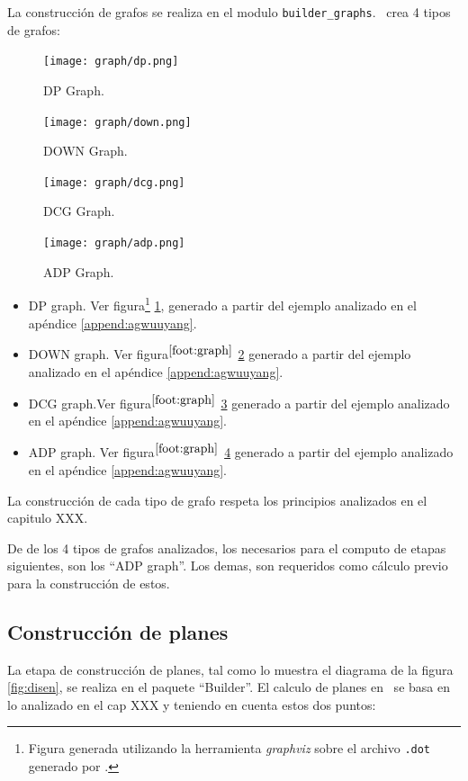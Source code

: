La construcción de grafos se realiza en el modulo \texttt{builder\_graphs}. \maggen\ crea 4 tipos de grafos:
\begin{figure}\centering
 \texttt{[image: graph/dp.png]}
\caption{\label{dpgraph} DP Graph.}
\end{figure}

\begin{figure}\centering
 \texttt{[image: graph/down.png]}
\caption{\label{downgraph} DOWN Graph.}
\end{figure}

\begin{figure}\centering
 \texttt{[image: graph/dcg.png]}
\caption{\label{dcggraph} DCG Graph.}
\end{figure}

\begin{figure}\centering
 \texttt{[image: graph/adp.png]}
\caption{\label{adpgraph} ADP Graph.}
\end{figure}


\begin{itemize}
\item DP graph. Ver figura\footnote {\label{foot:graph} Figura generada utilizando la herramienta \textit{graphviz} sobre el archivo \texttt{.dot} generado por \maggen.} \ref{dpgraph}, generado a partir del ejemplo analizado en el apéndice \ref{append:agwuuyang}.
\item DOWN graph. Ver figura$^{\ref{foot:graph}}$ \ref{downgraph} generado a partir del ejemplo analizado en el apéndice \ref{append:agwuuyang}.
\item DCG graph.Ver figura$^{\ref{foot:graph}}$ \ref{dcggraph} generado a partir del ejemplo analizado en el apéndice \ref{append:agwuuyang}.
\item ADP graph. Ver figura$^{\ref{foot:graph}}$  \ref{adpgraph} generado a partir del ejemplo analizado en el apéndice \ref{append:agwuuyang}.
\end{itemize}

La construcción de cada tipo de grafo respeta los principios analizados en el capitulo XXX. 

De de los 4 tipos de grafos analizados, los necesarios para el computo de etapas siguientes, son los ``ADP graph''. Los demas, son requeridos como cálculo previo para la construcción de estos.


\subsection*{Construcción de planes}
La etapa de construcción de planes, tal como lo muestra el diagrama de la figura \ref{fig:disen}, se realiza en el paquete ``Builder''. El calculo de planes en \maggen\ se basa en lo analizado en el cap XXX y teniendo en cuenta estos dos puntos:


